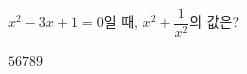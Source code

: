 $x^2-3x+1=0$일 때, $x^2+\dfrac{1}{x^2}$의 값은?
\begin{choices32}{$5$}{$6$}{$7$}{$8$}{$9$}\end{choices32}
